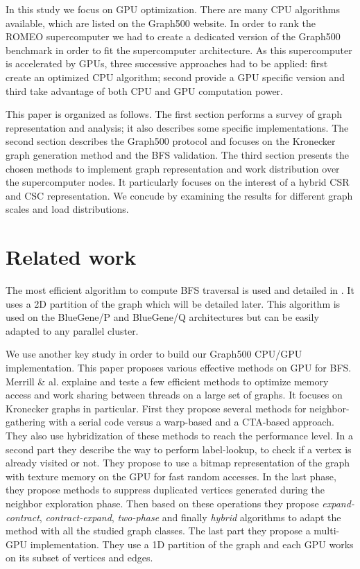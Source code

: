 In this study we focus on GPU optimization. 
There are many CPU algorithms available, which are listed on the Graph500 website. 
In order to rank the ROMEO supercomputer we had to create a dedicated version of the Graph500 benchmark in order to fit the supercomputer architecture. 
As this supercomputer is accelerated by GPUs, three successive approaches had to be applied:  first create an optimized CPU algorithm; second provide a GPU specific version and third take advantage of both CPU and GPU computation power. 

This paper is organized as follows.
The first section performs a survey of graph representation and analysis; it also describes some specific implementations.
The second section  describes the Graph500 protocol and focuses on the Kronecker graph generation method and the BFS validation.
The third section presents the chosen methods to implement graph representation and work distribution over the supercomputer nodes. It particularly focuses on the interest of a hybrid CSR and CSC representation.
We concude by examining the results for different graph scales and load distributions.

\section{Related work}
The most efficient algorithm to compute BFS traversal is used and detailed in \cite{6468459}. 
It uses a 2D partition of the graph which will be detailed later. 
This algorithm is used on the BlueGene/P and BlueGene/Q architectures but can be easily adapted to any parallel cluster.


We use another key study in order to build our Graph500 CPU/GPU implementation. 
This paper \cite{merrill2015high} proposes various effective methods on GPU for BFS. 
Merrill \& al. explaine and teste a few efficient methods to optimize memory access and work sharing between threads on a large set of graphs. 
It focuses on Kronecker graphs in particular. 
First they propose several methods for neighbor-gathering with a serial code versus a warp-based and a CTA-based approach. 
They also use hybridization of these methods to reach the performance level. 
In a second part they describe the way to perform label-lookup, to check if a vertex is already visited or not. 
They propose to use a bitmap representation of the graph with texture memory on the GPU for fast random accesses. 
In the last phase, they propose methods to suppress duplicated vertices generated during the neighbor exploration phase. 
Then based on these operations they propose \textit{expand-contract}, \textit{contract-expand}, \textit{two-phase} and finally \textit{hybrid} algorithms to adapt the method with all the studied graph classes.
The last part they propose a multi-GPU implementation.
They use a 1D partition of the graph and each GPU works on its subset of vertices and edges. 

